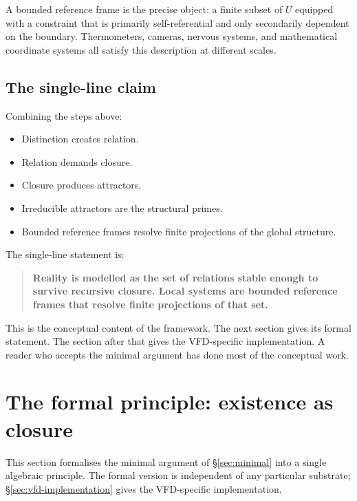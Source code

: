 \documentclass[11pt]{article}
\theoremstyle{plain}
\theoremstyle{definition}
\theoremstyle{remark}
\begin{document}
A bounded reference frame is the precise object: a finite subset of $U$ equipped with a constraint that is primarily self-referential and only secondarily dependent on the boundary. Thermometers, cameras, nervous systems, and mathematical coordinate systems all satisfy this description at different scales.

\subsection{The single-line claim}

Combining the steps above:

\begin{itemize}[leftmargin=2em]
\item Distinction creates relation.
\item Relation demands closure.
\item Closure produces attractors.
\item Irreducible attractors are the structural primes.
\item Bounded reference frames resolve finite projections of the global structure.
\end{itemize}

The single-line statement is:

\begin{quote}
\textbf{Reality is modelled as the set of relations stable enough to survive recursive closure. Local systems are bounded reference frames that resolve finite projections of that set.}
\end{quote}

This is the conceptual content of the framework. The next section gives its formal statement. The section after that gives the VFD-specific implementation. A reader who accepts the minimal argument has done most of the conceptual work.

\section{The formal principle: existence as closure}\label{sec:formal}

This section formalises the minimal argument of \S\ref{sec:minimal} into a single algebraic principle. The formal version is independent of any particular substrate; \S\ref{sec:vfd-implementation} gives the VFD-specific implementation.
\end{document}
